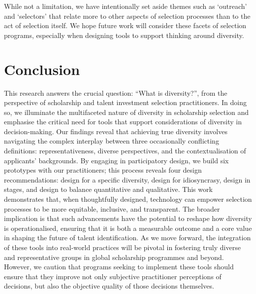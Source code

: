 While not a limitation, we have intentionally set aside themes such as `outreach' and `selectors' that relate more to other aspects of selection processes than to the act of selection itself. We hope future work will consider these facets of selection programs, especially when designing tools to support thinking around diversity.

\section{Conclusion}
This research answers the crucial question: ``What is diversity?'', from the perspective of scholarship and talent investment selection practitioners. In doing so, we illuminate the multifaceted nature of diversity in scholarship selection and emphasise the critical need for tools that support considerations of diversity in decision-making. Our findings reveal that achieving true diversity involves navigating the complex interplay between three occasionally conflicting definitions: representativeness, diverse perspectives, and the contextualisation of applicants' backgrounds. By engaging in participatory design, we build six prototypes with our practitioners; this process reveals four design recommendations: design for a specific diversity, design for idiosyncrasy, design in stages, and design to balance quantitative and qualitative. This work demonstrates that, when thoughtfully designed, technology can empower selection processes to be more equitable, inclusive, and transparent. The broader implication is that such advancements have the potential to reshape how diversity is operationalised, ensuring that it is both a measurable outcome and a core value in shaping the future of talent identification. As we move forward, the integration of these tools into real-world practices will be pivotal in fostering truly diverse and representative groups in global scholarship programmes and beyond. However, we caution that programs seeking to implement these tools should ensure that they improve not only subjective practitioner perceptions of decisions, but also the objective quality of those decisions themselves.
